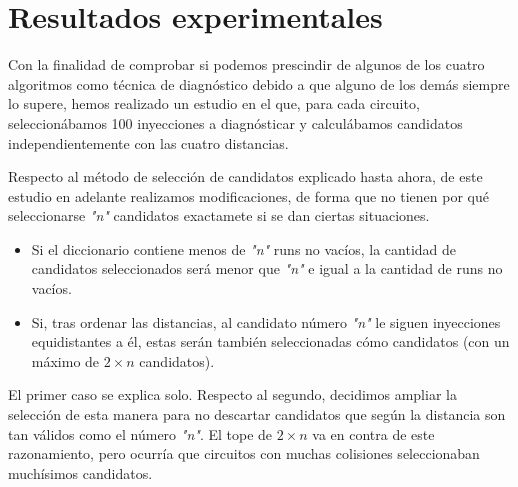 \section{Resultados experimentales}
\label{sec:4Results}
Con la finalidad de comprobar si podemos prescindir de algunos de los cuatro
algoritmos como técnica de diagnóstico debido a que alguno de los demás siempre lo
supere, hemos realizado un estudio en el que, para cada circuito, seleccionábamos
100 inyecciones a diagnósticar y calculábamos candidatos independientemente con
las cuatro distancias.

Respecto al método de selección de candidatos explicado hasta ahora, de este
estudio en adelante realizamos modificaciones, de forma que no tienen por qué
seleccionarse \textit{"n"} candidatos exactamete si se dan ciertas situaciones.
\begin{itemize}
    \item Si el diccionario contiene menos de \textit{"n"} runs no vacíos, la
        cantidad de candidatos seleccionados será menor que \textit{"n"} e igual
        a la cantidad de runs no vacíos.
    \item Si, tras ordenar las distancias, al candidato número \textit{"n"} le
        siguen inyecciones equidistantes a él, estas serán también seleccionadas
        cómo candidatos (con un máximo de $2 \times n$ candidatos).
\end{itemize}

El primer caso se explica solo. Respecto al segundo, decidimos ampliar la
selección de esta manera para no descartar candidatos que según la distancia son
tan válidos como el número \textit{"n"}. El tope de $2 \times n$ va en contra de
este razonamiento, pero ocurría que circuitos con muchas colisiones seleccionaban
muchísimos candidatos.







\endinput
